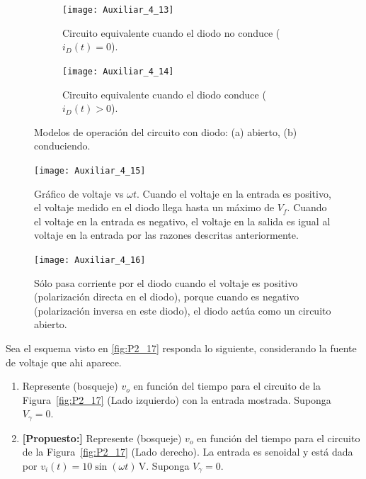 \documentclass[
  11pt,
  letterpaper,
   addpoints,
   answers
  ]{exam}
\begin{document}
\begin{questions}
\begin{solution}
\begin{figure}[H]
  \centering
  \begin{subfigure}[b]{0.48\textwidth}
    \centering
    \texttt{[image: Auxiliar\_4\_13]}
    \caption{Circuito equivalente cuando el diodo no conduce ($i_D(t) = 0$).}
    \label{fig:diodo-abierto}
  \end{subfigure}\hfill
  \begin{subfigure}[b]{0.48\textwidth}
    \centering
    \texttt{[image: Auxiliar\_4\_14]}
    \caption{Circuito equivalente cuando el diodo conduce ($i_D(t) > 0$).}
    \label{fig:diodo-conduce}
  \end{subfigure}
  \caption{Modelos de operación del circuito con diodo: (a) abierto, (b) conduciendo.}
  \label{fig:diodo-operacion-casos}
\end{figure}
\begin{figure}[H]
    \centering
    \texttt{[image: Auxiliar\_4\_15]}
  \caption{Gráfico de voltaje vs $\omega t$. Cuando el voltaje en la entrada es positivo, el voltaje medido en el diodo llega hasta un máximo de $V_f$. Cuando el voltaje en la entrada es negativo, el voltaje en la salida es igual al voltaje en la entrada por las razones descritas anteriormente.}
    \label{fig:voltaje-corriente-diodo}
\end{figure}
\begin{figure}[H]
    \centering
    \texttt{[image: Auxiliar\_4\_16]}
  \caption{Sólo pasa corriente por el diodo cuando el voltaje es positivo (polarización directa en el diodo), porque cuando es negativo (polarización inversa en este diodo), el diodo actúa como un circuito abierto.}
    \label{fig:voltaje-corriente-diodo-detalle}
\end{figure}
\end{solution}
\question Sea el esquema visto en \ref{fig:P2_17} responda lo siguiente, considerando la fuente de voltaje que ahi aparece.
\begin{enumerate}
    \item Represente (bosqueje) \(v_o\) en función del tiempo para el circuito de la Figura~\ref{fig:P2_17} (Lado izquierdo)
    con la entrada mostrada. Suponga \(V_\gamma = 0\).
    \item \textbf{[Propuesto:]} Represente (bosqueje) \(v_o\) en función del tiempo para el circuito de la
  Figura~\ref{fig:P2_17} (Lado derecho). La entrada es senoidal y está dada por
  \(v_i(t) = 10 \sin(\omega t)\,\text{V}\). Suponga \(V_\gamma = 0\).
\end{enumerate}


\end{questions}
\end{document}
